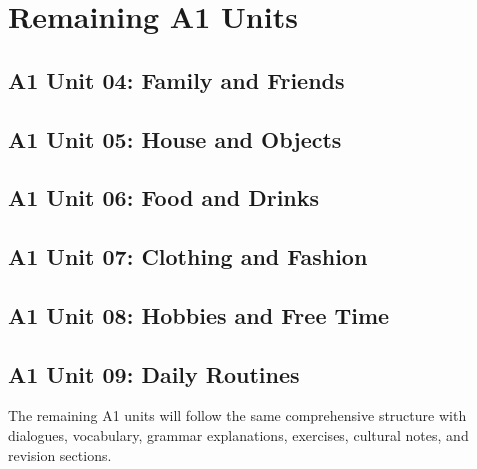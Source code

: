 
\clearpage


\chapter{Remaining A1 Units}
\label{chap:a1-remaining}

\section*{A1 Unit 04: Family and Friends}
\section*{A1 Unit 05: House and Objects}
\section*{A1 Unit 06: Food and Drinks}
\section*{A1 Unit 07: Clothing and Fashion}
\section*{A1 Unit 08: Hobbies and Free Time}
\section*{A1 Unit 09: Daily Routines}

\begin{center}

\end{center}

\begin{notebox}
The remaining A1 units will follow the same comprehensive structure with dialogues, vocabulary, grammar explanations, exercises, cultural notes, and revision sections.
\end{notebox}

